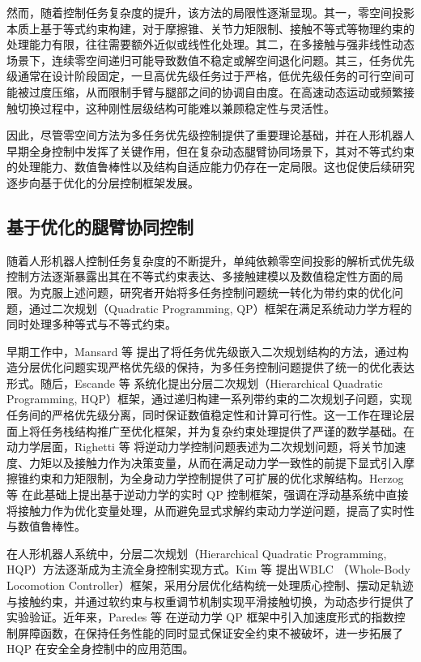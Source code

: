 然而，随着控制任务复杂度的提升，该方法的局限性逐渐显现。其一，零空间投影本质上基于等式约束构建，对于摩擦锥、关节力矩限制、接触不等式等物理约束的处理能力有限，往往需要额外近似或线性化处理。其二，在多接触与强非线性动态场景下，连续零空间递归可能导致数值不稳定或解空间退化问题。其三，任务优先级通常在设计阶段固定，一旦高优先级任务过于严格，低优先级任务的可行空间可能被过度压缩，从而限制手臂与腿部之间的协调自由度。在高速动态运动或频繁接触切换过程中，这种刚性层级结构可能难以兼顾稳定性与灵活性。

因此，尽管零空间方法为多任务优先级控制提供了重要理论基础，并在人形机器人早期全身控制中发挥了关键作用，但在复杂动态腿臂协同场景下，其对不等式约束的处理能力、数值鲁棒性以及结构自适应能力仍存在一定局限。这也促使后续研究逐步向基于优化的分层控制框架发展。

\subsection{基于优化的腿臂协同控制}

随着人形机器人控制任务复杂度的不断提升，单纯依赖零空间投影的解析式优先级控制方法逐渐暴露出其在不等式约束表达、多接触建模以及数值稳定性方面的局限\cite{chiaverini2002singularity,kanoun2011kinematic}。为克服上述问题，研究者开始将多任务控制问题统一转化为带约束的优化问题，通过二次规划（Quadratic Programming, QP）框架在满足系统动力学方程的同时处理多种等式与不等式约束\cite{escande2014hierarchical,del2015prioritized}。



早期工作中，Mansard 等 \cite{Mansard2009} 提出了将任务优先级嵌入二次规划结构的方法，通过构造分层优化问题实现严格优先级的保持，为多任务控制问题提供了统一的优化表达形式。随后，Escande 等 \cite{Escande2014} 系统化提出分层二次规划（Hierarchical Quadratic Programming, HQP）框架，通过递归构建一系列带约束的二次规划子问题，实现任务间的严格优先级分离，同时保证数值稳定性和计算可行性。这一工作在理论层面上将任务栈结构推广至优化框架，并为复杂约束处理提供了严谨的数学基础。在动力学层面，Righetti 等 \cite{Righetti2011} 将逆动力学控制问题表述为二次规划问题，将关节加速度、力矩以及接触力作为决策变量，从而在满足动力学一致性的前提下显式引入摩擦锥约束和力矩限制，为全身动力学控制提供了可扩展的优化求解结构。Herzog 等 \cite{Herzog2016} 在此基础上提出基于逆动力学的实时 QP 控制框架，强调在浮动基系统中直接将接触力作为优化变量处理，从而避免显式求解约束动力学逆问题，提高了实时性与数值鲁棒性。

在人形机器人系统中，分层二次规划（Hierarchical Quadratic Programming, HQP）方法逐渐成为主流全身控制实现方式\cite{李思敏2024}。Kim 等 \cite{kim2020dynamic} 提出WBLC      （Whole-Body Locomotion Controller）框架，采用分层优化结构统一处理质心控制、摆动足轨迹与接触约束，并通过软约束与权重调节机制实现平滑接触切换，为动态步行提供了实验验证。近年来，Paredes 等 \cite{paredes2024safe} 在逆动力学 QP 框架中引入加速度形式的指数控制屏障函数，在保持任务性能的同时显式保证安全约束不被破坏，进一步拓展了 HQP 在安全全身控制中的应用范围。

